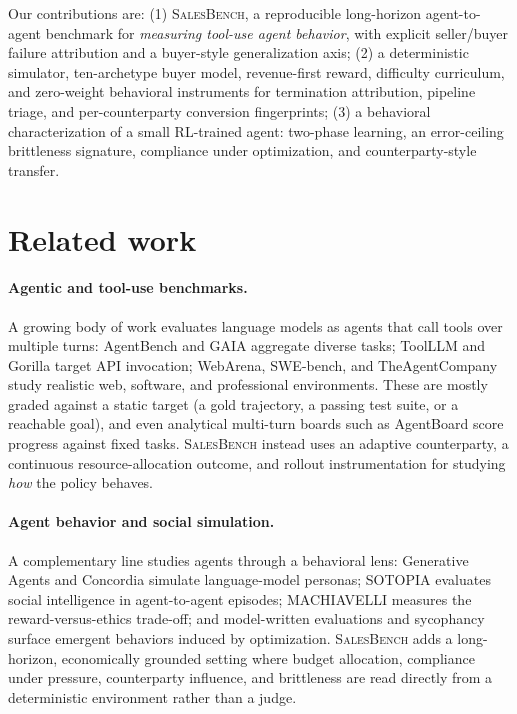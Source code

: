\documentclass{article} %
\newcommand{\salesbench}{\textsc{SalesBench}}
\begin{document}
Our contributions are: (1) \salesbench{}, a reproducible long-horizon agent-to-agent benchmark for
\emph{measuring tool-use agent behavior}, with explicit seller/buyer failure attribution and a buyer-style
generalization axis; (2) a deterministic simulator, ten-archetype buyer model, revenue-first reward,
difficulty curriculum, and zero-weight behavioral instruments for termination attribution, pipeline triage, and
per-counterparty conversion fingerprints; (3) a behavioral characterization of a small RL-trained agent:
two-phase learning, an error-ceiling brittleness signature, compliance under optimization, and counterparty-style
transfer.

\section{Related work}

\paragraph{Agentic and tool-use benchmarks.} A growing body of work evaluates language models as agents that call
tools over multiple turns: AgentBench \citep{liu2024agentbench} and GAIA \citep{mialon2024gaia} aggregate diverse
tasks; ToolLLM \citep{qin2024toolllm} and Gorilla \citep{patil2024gorilla} target API invocation; WebArena,
SWE-bench, and TheAgentCompany \citep{zhou2024webarena, jimenez2024swebench, xu2024theagentcompany} study realistic
web, software, and professional environments. These are mostly graded against a static target (a gold trajectory, a
passing test suite, or a reachable goal), and even analytical multi-turn boards such as AgentBoard
\citep{ma2024agentboard} score progress against fixed tasks. \salesbench{} instead uses an adaptive counterparty, a
continuous resource-allocation outcome, and rollout instrumentation for studying \emph{how} the policy behaves.

\paragraph{Agent behavior and social simulation.} A complementary line studies agents through a behavioral lens:
Generative Agents \citep{park2023generative} and Concordia \citep{vezhnevets2023concordia} simulate language-model
personas; SOTOPIA \citep{zhou2024sotopia} evaluates social intelligence in agent-to-agent episodes; MACHIAVELLI
\citep{pan2023machiavelli} measures the reward-versus-ethics trade-off; and model-written evaluations
\citep{perez2022discovering} and sycophancy \citep{sharma2024sycophancy} surface emergent behaviors induced by
optimization. \salesbench{} adds a long-horizon, economically grounded setting where budget allocation, compliance
under pressure, counterparty influence, and brittleness are read directly from a deterministic environment rather
than a judge.
\end{document}
